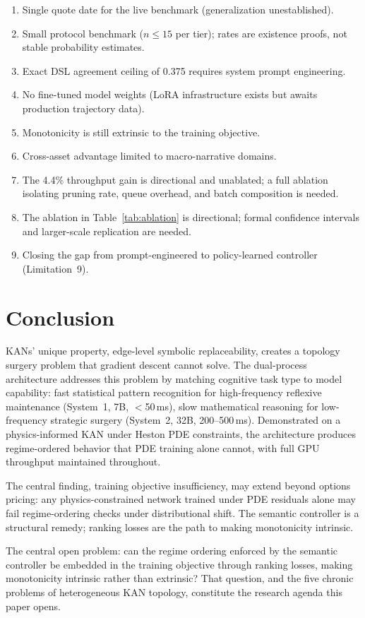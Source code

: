\documentclass[11pt,a4paper]{article}
\begin{document}
\begin{enumerate}
  \item Single quote date for the live benchmark (generalization unestablished).
  \item Small protocol benchmark ($n \leq 15$ per tier); rates are existence proofs,
  not stable probability estimates.
  \item Exact DSL agreement ceiling of 0.375 requires system prompt engineering.
  \item No fine-tuned model weights (LoRA infrastructure exists but awaits production
  trajectory data).
  \item Monotonicity is still extrinsic to the training objective.
  \item Cross-asset advantage limited to macro-narrative domains.
  \item The 4.4\% throughput gain is directional and unablated; a full ablation
  isolating pruning rate, queue overhead, and batch composition is needed.
  \item The ablation in Table~\ref{tab:ablation} is directional; formal confidence
  intervals and larger-scale replication are needed.
  \item Closing the gap from prompt-engineered to policy-learned controller (Limitation~9).
\end{enumerate}

\section{Conclusion}
\label{sec:conclusion}

KANs' unique property, edge-level symbolic replaceability, creates a topology
surgery problem that gradient descent cannot solve. The dual-process architecture
addresses this problem by matching cognitive task type to model capability: fast
statistical pattern recognition for high-frequency reflexive maintenance (System~1,
7B, $<$50\,ms), slow mathematical reasoning for low-frequency strategic surgery
(System~2, 32B, 200--500\,ms). Demonstrated on a physics-informed KAN under Heston
PDE constraints, the architecture produces regime-ordered behavior that PDE training
alone cannot, with full GPU throughput maintained throughout.

The central finding, training objective insufficiency, may extend beyond options
pricing: any physics-constrained network trained under PDE residuals alone may fail
regime-ordering checks under distributional shift. The semantic controller is a
structural remedy; ranking losses are the path to making monotonicity intrinsic.

The central open problem: can the regime ordering enforced by the semantic controller
be embedded in the training objective through ranking losses, making monotonicity
intrinsic rather than extrinsic? That question, and the five chronic problems of
heterogeneous KAN topology, constitute the research agenda this paper opens.



\end{document}
